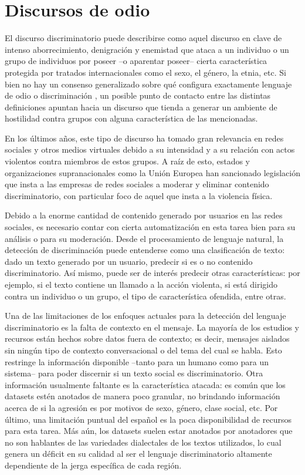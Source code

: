 
\section{Discursos de odio}


El discurso discriminatorio puede describirse como aquel discurso en clave de intenso aborrecimiento, denigración y enemistad que ataca a un individuo o un grupo de individuos por poseer --o aparentar poseer-- cierta característica protegida por tratados internacionales como el sexo, el género, la etnia, etc. Si bien no hay un consenso generalizado sobre qué configura exactamente lenguaje de odio o discriminación \cite{article192015}, un posible punto de contacto entre las distintas definiciones apuntan hacia un discurso que tienda a generar un ambiente de hostilidad contra grupos con alguna característica de las mencionadas.

En los últimos años, este tipo de discurso ha tomado gran relevancia en redes sociales y otros medios virtuales debido a su intensidad y a su relación con actos violentos contra miembros de estos grupos. A raíz de esto, estados y organizaciones supranacionales como la Unión Europea han sancionado legislación que insta a las empresas de redes sociales a moderar y eliminar contenido discriminatorio, con particular foco de aquel que insta a la violencia física.

Debido a la enorme cantidad de contenido generado por usuarios en las redes sociales, es necesario contar con cierta automatización en esta tarea bien para su análisis o para su moderación. Desde el procesamiento de lenguaje natural, la detección de discriminación puede entenderse como una clasificación de texto: dado un texto generado por un usuario, predecir si es o no contenido discriminatorio. Así mismo, puede ser de interés predecir otras características: por ejemplo, si el texto contiene un llamado a la acción violenta, si está dirigido contra un individuo o un grupo, el tipo de característica ofendida, entre otras.

Una de las limitaciones de los enfoques actuales para la detección del lenguaje discriminatorio es la falta de contexto en el mensaje. La mayoría de los estudios y recursos están hechos sobre datos fuera de contexto; es decir, mensajes aislados sin ningún tipo de contexto conversacional o del tema del cual se habla. Esto restringe la información disponible --tanto para un humano como para un sistema-- para poder discernir si un texto social es discriminatorio. Otra información usualmente faltante es la característica atacada: es común que los datasets estén anotados de manera poco granular, no brindando información acerca de si la agresión es por motivos de sexo, género, clase social, etc. Por último, una limitación puntual del español es la poca disponibilidad de recursos para esta tarea. Más aún, los datasets suelen estar anotados por anotadores que no son hablantes de las variedades dialectales de los textos utilizados, lo cual genera un déficit en su calidad al ser el lenguaje discriminatorio altamente dependiente de la jerga específica de cada región.


